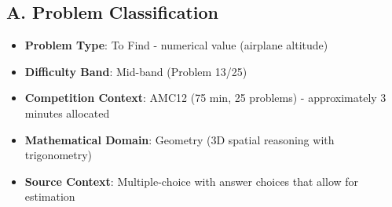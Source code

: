 \documentclass[12pt]{article}
\begin{document}
\begin{problemconfigbox}
\subsection*{A. Problem Classification}
\begin{itemize}[leftmargin=*]
    \item \textbf{Problem Type}: To Find - numerical value (airplane altitude)
    \item \textbf{Difficulty Band}: Mid-band (Problem 13/25)
    \item \textbf{Competition Context}: AMC12 (75 min, 25 problems) - approximately 3 minutes allocated
    \item \textbf{Mathematical Domain}: Geometry (3D spatial reasoning with trigonometry)
    \item \textbf{Source Context}: Multiple-choice with answer choices that allow for estimation
\end{itemize}


\end{problemconfigbox}
\end{document}
